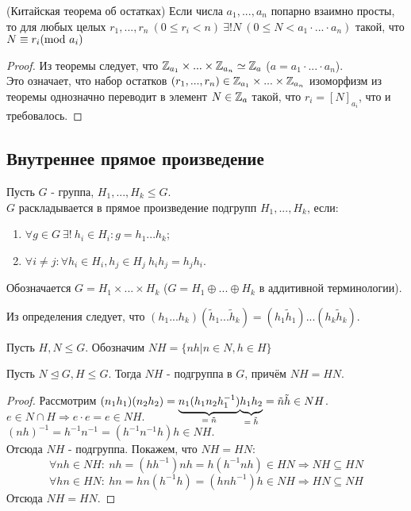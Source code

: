 \begin{consequense}(Китайская теорема об остатках)
    Если числа $a_1,...,a_n$ попарно взаимно просты, то для любых целых $r_1,...,r_n \ (0 \leq r_i < n) \ \exists ! N \ (0 \leq N < a_1\cdot...\cdot a_n)$ такой, что $N \equiv r_i (\textup{mod } a_i)$ 
\end{consequense}
\begin{proof}
    Из теоремы следует, что $\mathbb{Z}_{a_1}\times...\times \mathbb{Z}_{a_n}\simeq \mathbb{Z}_a$ ($a = a_1\cdot...\cdot a_n$).\\
    Это означает, что набор остатков $(r_1,...,r_n) \in \mathbb{Z}_{a_1}\times...\times \mathbb{Z}_{a_n}$ изоморфизм из теоремы однозначно переводит в элемент $N \in \mathbb{Z}_a$ такой, что $r_i = [N]_{a_i}$, что и требовалось.
\end{proof}
\subsection{Внутреннее прямое произведение}
\begin{definition}
    Пусть $G$ - группа, $H_1,...,H_k \leq G$.\\
    $G$ раскладывается в прямое произведение подгрупп $H_1,...,H_k$, если:
    \begin{enumerate}
        \item $\forall g \in G \ \exists! \ h_i \in H_i : g = h_1...h_k$;
        \item $\forall i \neq j: \forall h_i \in H_i, h_j \in H_j \ h_ih_j = h_jh_i$.
    \end{enumerate}
    Обозначается $G = H_1 \times ... \times H_k$ ($G = H_1 \oplus ... \oplus H_k$ в аддитивной терминологии).
\end{definition}
\begin{remark}
    Из определения следует, что $(h_1...h_k)(\tilde{h}_1...\tilde{h}_k) = (h_1\tilde{h}_1)...(h_k\tilde{h}_k)$. 
\end{remark}
\begin{definition}
    Пусть $H, N \leq G$. Обозначим $NH = \{nh | n \in N, h \in H\}$
\end{definition}
\begin{subtheorem}
    Пусть $N\unlhd G, H \leq G$. Тогда $NH$ - подгруппа в $G$, причём $NH = HN$.  
\end{subtheorem}
\begin{proof}
    Рассмотрим $(n_1h_1)(n_2h_2) = \undermat{= \tilde{n}}{n_1(h_1n_2h_1^{-1})}\undermat{= \tilde{h}}{h_1h_2} = \tilde{n}\tilde{h} \in NH$.\\
    $e \in N \cap H \Longrightarrow e \cdot e = e \in NH$.\\
    $(nh)^{-1} = h^{-1}n^{-1} = (h^{-1}n^{-1}h)h \in NH$.\\
    Отсюда $NH$ - подгруппа. Покажем, что $NH = HN$:
    \[\forall nh \in NH:\ nh = (hh^{-1})nh = h(h^{-1}nh) \in HN \Longrightarrow NH \subseteq HN\]
    \[\forall hn \in HN:\ hn = hn(h^{-1}h) = (hnh^{-1})h  \in NH \Longrightarrow HN \subseteq NH\]
    Отсюда $NH = HN$.
\end{proof}
